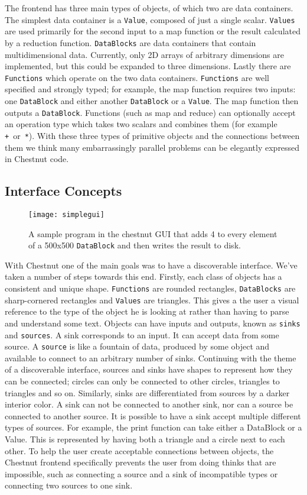 \documentclass[twocolumn]{article}
\renewcommand{\|}{\origbar} %
\newcommand{\code}[1]{\texttt{#1}}
\begin{document}
The frontend has three main types of objects, of which two are data containers. The simplest data container is a \code{Value}, composed of just a single scalar. \code{Values} are used primarily for the second input to a map function or the result calculated by a reduction function. \code{DataBlocks} are data containers that contain multidimensional data. Currently, only 2D arrays of arbitrary dimensions are implemented, but this could be expanded to three dimensions. Lastly there are \code{Functions} which operate on the two data containers. \code{Functions} are well specified and strongly typed; for example, the map function requires two inputs: one \code{DataBlock} and either another \code{DataBlock} or a \code{Value}. The map function then outputs a \code{DataBlock}. Functions (such as map and reduce) can optionally accept an operation type which takes two scalars and combines them (for example \code{+}~or~\code{*}). With these three types of primitive objects and the connections between them we think many embarrassingly parallel problems can be elegantly expressed in Chestnut code.

\subsection{Interface Concepts}

\begin{figure}[h!]
  \centering
    \texttt{[image: simplegui]}
    \caption{A sample program in the chestnut GUI that adds 4 to every element of a 500x500 \code{DataBlock} and then writes the result to disk.}
\end{figure}

With Chestnut one of the main goals was to have a discoverable interface. We've taken a number of steps towards this end. Firstly, each class of objects has a consistent and unique shape. \code{Functions} are rounded rectangles, \code{DataBlocks} are sharp-cornered rectangles and \code{Values} are triangles. This gives a the user a visual reference to the type of the object he is looking at rather than having to parse and understand some text. Objects can have inputs and outputs, known as \code{sinks} and \code{sources}. A sink corresponds to an input. It can accept data from some source. A \code{source} is like a fountain of data, produced by some object and available to connect to an arbitrary number of sinks. Continuing with the theme of a discoverable interface, sources and sinks have shapes to represent how they can be connected; circles can only be connected to other circles, triangles to triangles and so on. Similarly, sinks are differentiated from sources by a darker interior color. A sink can not be connected to another sink, nor can a source be connected to another source. It is possible to have a sink accept multiple different types of sources. For example, the print function can take either a DataBlock or a Value. This is represented by having both a triangle and a circle next to each other. To help the user create acceptable connections between objects, the Chestnut frontend specifically prevents the user from doing thinks that are impossible, such as connecting a source and a sink of incompatible types or connecting two sources to one sink.
\end{document}
